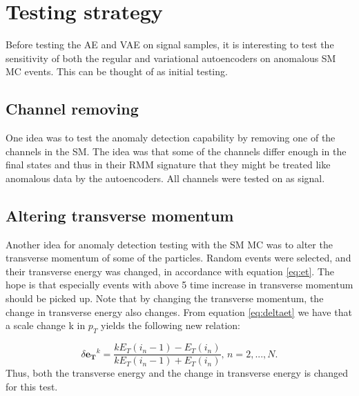 \section*{Testing strategy}

Before testing the AE and VAE on signal samples, it is interesting to test the sensitivity of 
both the regular and variational autoencoders on anomalous SM MC events. This can be thought of as initial testing. 
\subsection*{Channel removing}
One idea was to test the anomaly detection capability by removing one of the channels in the SM.
The idea was that some of the channels differ enough in the final states and thus in their RMM signature that
they might be treated like anomalous data by the autoencoders. All channels were tested on as signal.
\subsection*{Altering transverse momentum}
Another idea for anomaly detection testing with the SM MC was to alter the transverse momentum of some of the particles. Random events were
selected, and their transverse energy was changed, in accordance with equation \ref{eq:et}. The hope is that especially events with above 5 time 
increase in transverse momentum should be picked up. Note that by changing the transverse momentum, the change in transverse energy also changes. 
From equation \ref{eq:deltaet} we have that a scale change k in $p_T$ yields the following new relation:

\begin{equation}\label{eq:deltaet_scale}
    \delta\boldsymbol{e_T}^k = \frac{kE_T(i_n-1) - E_T(i_n)}{kE_T(i_n-1) + E_T(i_n)}, \, n = 2, ..., N.
\end{equation}
Thus, both the transverse energy and the change in transverse energy is changed for this test.


